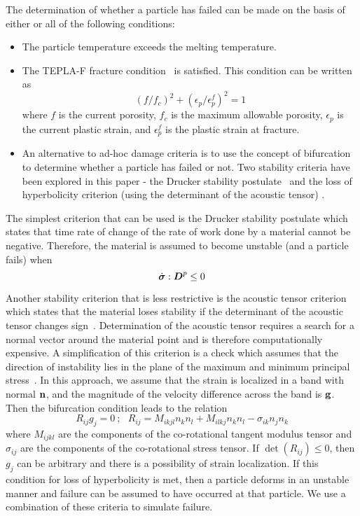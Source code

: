   The determination of whether a particle has failed can be made on the 
  basis of either or all of the following conditions:
  \begin{itemize}
    \item The particle temperature exceeds the melting temperature.
    \item The TEPLA-F fracture condition~\cite{Johnson1988} is satisfied.
       This condition can be written as
       \begin{equation}
         (f/f_c)^2 + (\epsilon_p/\epsilon_p^f)^2 = 1
       \end{equation}
       where $f$ is the current porosity, $f_c$ is the maximum 
       allowable porosity, $\epsilon_p$ is the current plastic strain, and
       $\epsilon_p^f$ is the plastic strain at fracture.
    \item An alternative to ad-hoc damage criteria is to use the concept of 
       bifurcation to determine whether a particle has failed or not.  Two
       stability criteria have been explored in this paper - the Drucker
       stability postulate~\cite{Drucker1959} and the loss of hyperbolicity
       criterion (using the determinant of the acoustic tensor)
       \cite{Rudnicki1975,Perzyna1998}.  
  \end{itemize}

  The simplest criterion that can be used is the Drucker stability postulate 
  \cite{Drucker1959} which states that time rate of change of the rate of 
  work done by a material cannot be negative.  Therefore, the material is 
  assumed to become unstable (and a particle fails) when
  \begin{equation}
    \dot{\boldsymbol{\sigma}}:\boldsymbol{D}^p \le 0
  \end{equation}

  Another stability criterion that is less restrictive is the acoustic
  tensor criterion which states that the material loses stability if the 
  determinant of the acoustic tensor changes sign~\cite{Rudnicki1975,Perzyna1998}.  
  Determination of the acoustic tensor requires a search for a normal vector 
  around the material point and is therefore computationally expensive.  A 
  simplification of this criterion is a check which assumes that the direction 
  of instability lies in the plane of the maximum and minimum principal 
  stress~\cite{Becker2002}.  In this approach, we assume that the strain is 
  localized in a band with normal $\mathbf{n}$, and the magnitude of the velocity 
  difference across the band is $\mathbf{g}$.  Then the bifurcation condition 
  leads to the relation 
  \begin{equation} 
    R_{ij} g_{j} = 0 ~;~~~
    R_{ij} = M_{ikjl} n_k n_l + M_{ilkj} n_k n_l - \sigma_{ik} n_j n_k
  \end{equation} 
  where $M_{ijkl}$ are the components of the co-rotational tangent
  modulus tensor and $\sigma_{ij}$ are the components of the co-rotational 
  stress tensor.  If $\det(R_{ij}) \le 0 $, then $g_j$ can be arbitrary and 
  there is a possibility of strain localization.  If this condition for 
  loss of hyperbolicity is met,  then a particle deforms in an unstable 
  manner and failure can be assumed to have occurred at that particle.  
  We use a combination of these criteria to simulate failure.

